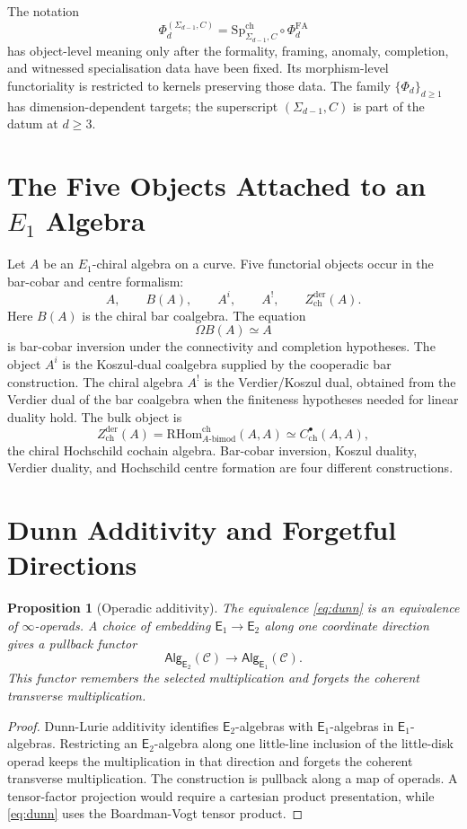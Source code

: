 \documentclass[11pt]{amsart}
\newtheorem{proposition}[theorem]{Proposition}
\theoremstyle{definition}
\theoremstyle{remark}
\newcommand{\Eone}{\mathsf{E}_1}
\newcommand{\Etwo}{\mathsf{E}_2}
\providecommand{\RHom}{\mathrm{RHom}}
\providecommand{\PhiFA}{\Phi^{\mathrm{FA}}}
\providecommand{\SpCh}{\mathrm{Sp}^{\mathrm{ch}}}
\newcommand{\cC}{\mathcal{C}}
\begin{document}
The notation
\[
  \Phi_d^{(\Sigma_{d-1},C)}
  =
  \SpCh_{\Sigma_{d-1},C}\circ\PhiFA_d
\]
has object-level meaning only after the formality, framing, anomaly,
completion, and witnessed specialisation data have been fixed.  Its
morphism-level functoriality is restricted to kernels preserving those
data.  The family $\{\Phi_d\}_{d\geq1}$ has dimension-dependent targets;
the superscript \((\Sigma_{d-1},C)\) is part of the datum at $d\geq3$.

\section{The Five Objects Attached to an \texorpdfstring{$E_1$}{E1} Algebra}
\label{sec:five-objects}

Let $A$ be an $E_1$-chiral algebra on a curve.  Five functorial objects
occur in the bar-cobar and centre formalism:
\[
  A,\qquad
  B(A),\qquad
  A^i,\qquad
  A^!,\qquad
  Z^{\mathrm{der}}_{\mathrm{ch}}(A).
\]
Here $B(A)$ is the chiral bar coalgebra.  The equation
\[
  \Omega B(A)\simeq A
\]
is bar-cobar inversion under the connectivity and completion
hypotheses.  The object $A^i$ is the Koszul-dual coalgebra supplied by
the cooperadic bar construction.  The chiral algebra $A^!$ is the
Verdier/Koszul dual, obtained from the Verdier dual of the bar coalgebra
when the finiteness hypotheses needed for linear duality hold.  The
bulk object is
\[
  Z^{\mathrm{der}}_{\mathrm{ch}}(A)
  =
  \RHom^{\mathrm{ch}}_{A\text{-bimod}}(A,A)
  \simeq
  C^\bullet_{\mathrm{ch}}(A,A),
\]
the chiral Hochschild cochain algebra.  Bar-cobar inversion, Koszul
duality, Verdier duality, and Hochschild centre formation are four
different constructions.

\section{Dunn Additivity and Forgetful Directions}

\begin{proposition}[Operadic additivity]
\label{prop:dunn-scope}
The equivalence \eqref{eq:dunn} is an equivalence of
$\infty$-operads.  A choice of embedding
$\Eone\to\Etwo$ along one coordinate direction gives a pullback functor
\[
  \mathsf{Alg}_{\Etwo}(\cC)
  \longrightarrow
  \mathsf{Alg}_{\Eone}(\cC).
\]
This functor remembers the selected multiplication and forgets the
coherent transverse multiplication.
\end{proposition}

\begin{proof}
Dunn-Lurie additivity identifies $\Etwo$-algebras with
$\Eone$-algebras in $\Eone$-algebras.  Restricting an
$\Etwo$-algebra along one little-line inclusion of the little-disk
operad keeps the multiplication in that direction and forgets the
coherent transverse multiplication.  The construction is pullback along
a map of operads.  A tensor-factor projection would require a cartesian
product presentation, while \eqref{eq:dunn} uses the Boardman-Vogt
tensor product.
\end{proof}
\end{document}

